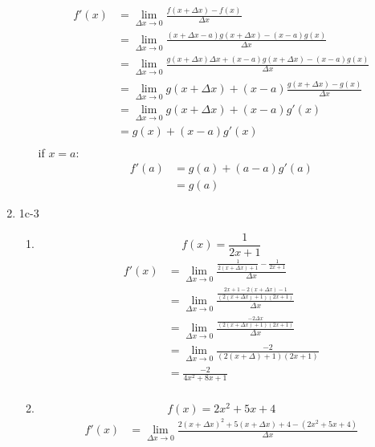 \documentclass{article}
\begin{document}
\begin{enumerate}
\begin{enumerate}
    \begin{align*}
        f'(x) &= \lim_{\Delta x \to 0} \frac{f(x + \Delta x) - f(x)}{\Delta x} \\
        &= \lim_{\Delta x \to 0} \frac{(x + \Delta x - a)g(x + \Delta x) - (x - a)g(x)}{\Delta x} \\
        &= \lim_{\Delta x \to 0} \frac{g(x + \Delta x) \Delta x + (x - a)g(x + \Delta x) - (x - a)g(x)}{\Delta x} \\
        &= \lim_{\Delta x \to 0} g(x + \Delta x) + (x - a)\frac{g(x + \Delta x) -g(x)}{\Delta x} \\
        &= \lim_{\Delta x \to 0} g(x + \Delta x) + (x - a)g'(x) \\
        &=  g(x) + (x - a)g'(x) \\
    \end{align*}
    if $x = a$:
    \begin{align*}
        f'(a) &= g(a) + (a-a)g'(a) \\
            &= g(a)
    \end{align*}
    \end{enumerate}
\item 1c-3
    \begin{enumerate}
        \item
        \begin{equation*}
            f(x) = \frac{1}{2x+1}
        \end{equation*}
        \begin{align*}
            f'(x) &= \lim_{\Delta x \to 0} \frac{\frac{1}{2(x + \Delta x) + 1} - \frac{1}{2x + 1}}{\Delta x} \\
            &= \lim_{\Delta x \to 0} \frac{\frac{2x+1 - 2(x+\Delta x) - 1}{(2(x+\Delta x) + 1)(2x+1)}}{\Delta x} \\
            &= \lim_{\Delta x \to 0} \frac{\frac{-2\Delta x}{(2(x+\Delta x) + 1)(2x+1)}}{\Delta x} \\
            &= \lim_{\Delta x \to 0} \frac{-2}{(2(x + \Delta) + 1)(2x + 1)} \\
            &= \frac{-2}{4x^2 + 8x + 1} \\
        \end{align*}
        \item
        \begin{equation*}
            f(x) = 2x^2 + 5x + 4
        \end{equation*}
        \begin{align*}
            f'(x) &= \lim_{\Delta x \to 0} \frac{2(x+\Delta x)^2 + 5(x+\Delta x) + 4 - (2x^2 + 5x + 4)}{\Delta x} \\

\end{align*}
\end{enumerate}
\end{enumerate}
\end{document}
